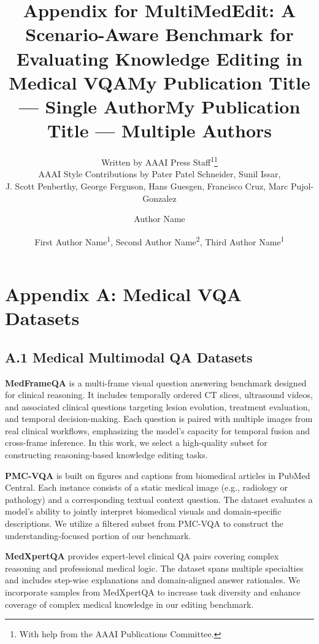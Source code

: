 \documentclass[letterpaper]{article} %
\title{Appendix for MultiMedEdit: A Scenario-Aware Benchmark for Evaluating
Knowledge Editing in Medical VQA}
\author{
    Written by AAAI Press Staff\textsuperscript{\rm 1}\thanks{With help from the AAAI Publications Committee.}\\
    AAAI Style Contributions by Pater Patel Schneider,
    Sunil Issar,\\
    J. Scott Penberthy,
    George Ferguson,
    Hans Guesgen,
    Francisco Cruz\equalcontrib,
    Marc Pujol-Gonzalez\equalcontrib
}
\title{My Publication Title --- Single Author}
\author {
    Author Name
}
\title{My Publication Title --- Multiple Authors}
\author {
    First Author Name\textsuperscript{\rm 1},
    Second Author Name\textsuperscript{\rm 2},
    Third Author Name\textsuperscript{\rm 1}
}
\begin{document}
\maketitle







\appendix
\section{Appendix A: Medical VQA Datasets}   

\subsection{A.1 Medical Multimodal QA Datasets}

\textbf{MedFrameQA} is a multi-frame visual question answering benchmark designed for clinical reasoning. It includes temporally ordered CT slices, ultrasound videos, and associated clinical questions targeting lesion evolution, treatment evaluation, and temporal decision-making. Each question is paired with multiple images from real clinical workflows, emphasizing the model’s capacity for temporal fusion and cross-frame inference. In this work, we select a high-quality subset for constructing reasoning-based knowledge editing tasks.

\noindent\textbf{PMC-VQA} is built on figures and captions from biomedical articles in PubMed Central. Each instance consists of a static medical image (e.g., radiology or pathology) and a corresponding textual context question. The dataset evaluates a model's ability to jointly interpret biomedical visuals and domain-specific descriptions. We utilize a filtered subset from PMC-VQA to construct the understanding-focused portion of our benchmark.

\noindent\textbf{MedXpertQA} provides expert-level clinical QA pairs covering complex reasoning and professional medical logic. The dataset spans multiple specialties and includes step-wise explanations and domain-aligned answer rationales. We incorporate samples from MedXpertQA to increase task diversity and enhance coverage of complex medical knowledge in our editing benchmark.
\end{document}
